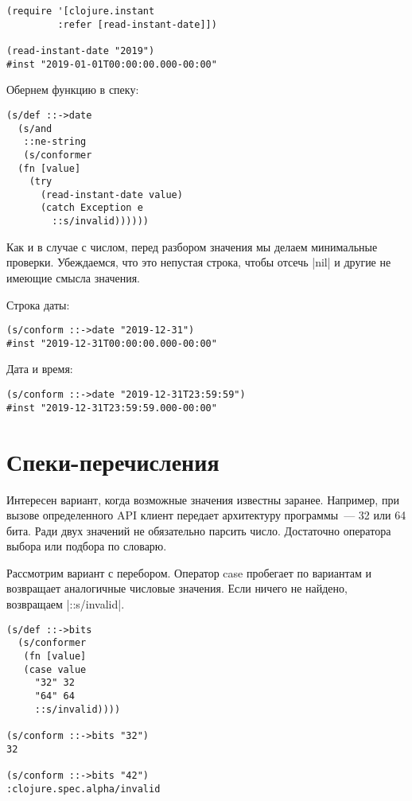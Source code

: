 \begin{verbatim}
(require '[clojure.instant
         :refer [read-instant-date]])

(read-instant-date "2019")
#inst "2019-01-01T00:00:00.000-00:00"
\end{verbatim}

Обернем функцию в спеку:

\begin{verbatim}
(s/def ::->date
  (s/and
   ::ne-string
   (s/conformer
  (fn [value]
    (try
      (read-instant-date value)
      (catch Exception e
        ::s/invalid))))))
\end{verbatim}

Как и в случае с числом, перед разбором значения мы делаем минимальные
проверки. Убеждаемся, что это непустая строка, чтобы отсечь \spverb|nil| и другие не
имеющие смысла значения.

Строка даты:

\begin{verbatim}
(s/conform ::->date "2019-12-31")
#inst "2019-12-31T00:00:00.000-00:00"
\end{verbatim}

Дата и время:

\begin{verbatim}
(s/conform ::->date "2019-12-31T23:59:59")
#inst "2019-12-31T23:59:59.000-00:00"
\end{verbatim}

\section{Спеки-перечисления}

Интересен вариант, когда возможные значения известны заранее. Например, при
вызове определенного API клиент передает архитектуру программы~--- 32 или 64
бита. Ради двух значений не обязательно парсить число. Достаточно оператора
выбора или подбора по словарю.

Рассмотрим вариант с перебором. Оператор case пробегает по вариантам и
возвращает аналогичные числовые значения. Если ничего не найдено, возвращаем
\spverb|::s/invalid|.

\begin{verbatim}
(s/def ::->bits
  (s/conformer
   (fn [value]
   (case value
     "32" 32
     "64" 64
     ::s/invalid))))

(s/conform ::->bits "32")
32

(s/conform ::->bits "42")
:clojure.spec.alpha/invalid
\end{verbatim}

